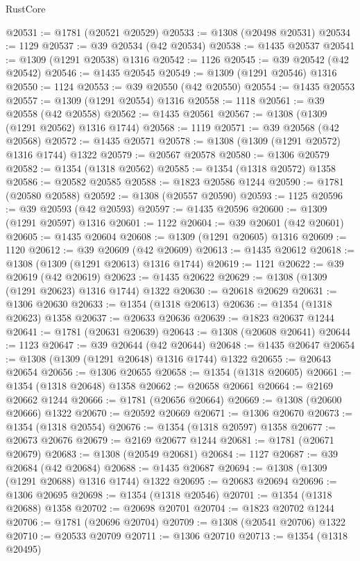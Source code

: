 \begin{lexlean}{RustCore}
\begin{coremodule}
@20531 := @1781 (@20521 @20529)
@20533 := @1308 (@20498 @20531)
@20534 := 1129
@20537 := @39 @20534 (@42 @20534)
@20538 := @1435 @20537
@20541 := @1309 (@1291 @20538) @1316
@20542 := 1126
@20545 := @39 @20542 (@42 @20542)
@20546 := @1435 @20545
@20549 := @1309 (@1291 @20546) @1316
@20550 := 1124
@20553 := @39 @20550 (@42 @20550)
@20554 := @1435 @20553
@20557 := @1309 (@1291 @20554) @1316
@20558 := 1118
@20561 := @39 @20558 (@42 @20558)
@20562 := @1435 @20561
@20567 := @1308 (@1309 (@1291 @20562) @1316 @1744)
@20568 := 1119
@20571 := @39 @20568 (@42 @20568)
@20572 := @1435 @20571
@20578 := @1308 (@1309 (@1291 @20572) @1316 @1744) @1322
@20579 := @20567 @20578
@20580 := @1306 @20579
@20582 := @1354 (@1318 @20562)
@20585 := @1354 (@1318 @20572) @1358
@20586 := @20582 @20585
@20588 := @1823 @20586 @1244
@20590 := @1781 (@20580 @20588)
@20592 := @1308 (@20557 @20590)
@20593 := 1125
@20596 := @39 @20593 (@42 @20593)
@20597 := @1435 @20596
@20600 := @1309 (@1291 @20597) @1316
@20601 := 1122
@20604 := @39 @20601 (@42 @20601)
@20605 := @1435 @20604
@20608 := @1309 (@1291 @20605) @1316
@20609 := 1120
@20612 := @39 @20609 (@42 @20609)
@20613 := @1435 @20612
@20618 := @1308 (@1309 (@1291 @20613) @1316 @1744)
@20619 := 1121
@20622 := @39 @20619 (@42 @20619)
@20623 := @1435 @20622
@20629 := @1308 (@1309 (@1291 @20623) @1316 @1744) @1322
@20630 := @20618 @20629
@20631 := @1306 @20630
@20633 := @1354 (@1318 @20613)
@20636 := @1354 (@1318 @20623) @1358
@20637 := @20633 @20636
@20639 := @1823 @20637 @1244
@20641 := @1781 (@20631 @20639)
@20643 := @1308 (@20608 @20641)
@20644 := 1123
@20647 := @39 @20644 (@42 @20644)
@20648 := @1435 @20647
@20654 := @1308 (@1309 (@1291 @20648) @1316 @1744) @1322
@20655 := @20643 @20654
@20656 := @1306 @20655
@20658 := @1354 (@1318 @20605)
@20661 := @1354 (@1318 @20648) @1358
@20662 := @20658 @20661
@20664 := @2169 @20662 @1244
@20666 := @1781 (@20656 @20664)
@20669 := @1308 (@20600 @20666) @1322
@20670 := @20592 @20669
@20671 := @1306 @20670
@20673 := @1354 (@1318 @20554)
@20676 := @1354 (@1318 @20597) @1358
@20677 := @20673 @20676
@20679 := @2169 @20677 @1244
@20681 := @1781 (@20671 @20679)
@20683 := @1308 (@20549 @20681)
@20684 := 1127
@20687 := @39 @20684 (@42 @20684)
@20688 := @1435 @20687
@20694 := @1308 (@1309 (@1291 @20688) @1316 @1744) @1322
@20695 := @20683 @20694
@20696 := @1306 @20695
@20698 := @1354 (@1318 @20546)
@20701 := @1354 (@1318 @20688) @1358
@20702 := @20698 @20701
@20704 := @1823 @20702 @1244
@20706 := @1781 (@20696 @20704)
@20709 := @1308 (@20541 @20706) @1322
@20710 := @20533 @20709
@20711 := @1306 @20710
@20713 := @1354 (@1318 @20495)

\end{coremodule}
\end{lexlean}
